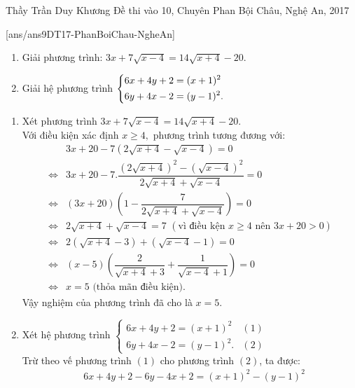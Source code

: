 \begin{name}
{Thầy Trần Duy Khương}
{Đề thi vào 10, Chuyên Phan Bội Châu, Nghệ An, 2017}
\end{name}
\setcounter{ex}{0}
[ans/ans9DT17-PhanBoiChau-NgheAn]
\begin{ex}%
    \hfill
    \begin{enumerate}
       \item Giải phương trình: $3x+7\sqrt{x-4}=14\sqrt{x+4}-20.$
      \item Giải hệ phương trình $\left\{\begin{aligned}6x+4y+2&=(x+1)^2\\
     6y+4x-2&=(y-1)^2. \end{aligned}\right.$
    \end{enumerate}
\loigiai
    {
    \begin{enumerate}
        \item Xét phương trình $3x+7\sqrt{x-4}=14\sqrt{x+4}-20.$
         \\Với điều kiện xác định $x\ge 4,$ phương trình tương đương với:
      {\allowdisplaybreaks
        \begin{align*}
        	&3x+20-7(2\sqrt{x+4}-\sqrt{x-4})=0\\
        	\Leftrightarrow&3x+20-7.\dfrac{(2\sqrt{x+4})^2-(\sqrt{x-4})^2}{2\sqrt{x+4}+\sqrt{x-4}}=0 \\
        	\Leftrightarrow&(3x+20)(1-\dfrac{7}{2\sqrt{x+4}+\sqrt{x-4}})=0\\
        	\Leftrightarrow&2\sqrt{x+4}+\sqrt{x-4}=7\,\, (\text{vì điều kện $x\ge 4$ nên $3x+20>0$})\\
        	\Leftrightarrow& 2(\sqrt{x+4}-3)+(\sqrt{x-4}-1)=0\\
        	\Leftrightarrow&(x-5)\left(\dfrac{2}{\sqrt{x+4}+3}+\dfrac{1}{\sqrt{x-4}+1}\right)=0\\
        	\Leftrightarrow&x=5\,\, \text{(thỏa mãn điều kiện).}\end{align*}}Vậy nghiệm của phương trình đã cho là $x=5$.
        \item Xét hệ phương trình $\left\{ \begin{array}{ll}
        6x + 4y + 2 = {(x + 1)^2}&(1)\\
        6y + 4x - 2 = {(y - 1)^2}.&(2)
        \end{array} \right.$\\
         Trừ theo vế phương trình $(1)$ cho phương trình $(2)$, ta được:
        {\allowdisplaybreaks
        \begin{align*}
        &6x+4y+2-6y-4x+2=(x+1)^2-(y-1)^2\\

\end{align*}}
\end{enumerate}}
\end{ex}
